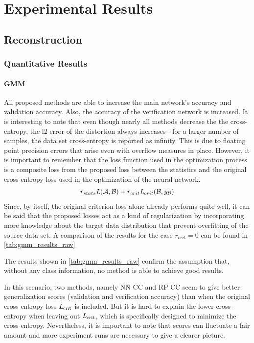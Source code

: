 \chapter{Experimental Results}
\label{chap:Results} 

\section{Reconstruction}

\subsection{Quantitative Results}

\subsubsection{GMM}

All proposed methods are able to increase the main network's accuracy and validation accuracy.
Also, the accuracy of the verification network is increased.
It is interesting to note that even though nearly all methods decrease the 
the cross-entropy, the l2-error of the distortion always increases
- for a larger number of samples, the data set cross-entropy is reported as infinity.
This is due to floating point precision errors that arise even with overflow measures in place.
However, it is important to remember that the loss function used in the optimization process
is a composite loss from the proposed loss between the statistics
and the original cross-entropy loss used in the optimization of the neural network.
\[
    r_{stats} \textit{L}(\mathcal A, \mathcal B) + r_{crit}\textit{L}_{crit}(\mathcal B, y_{\mathcal B})
\]
Since, by itself, the original criterion loss alone already performs quite well, 
it can be said that the proposed losses act as a kind of regularization 
by incorporating more knowledge about the target data distribution that prevent overfitting
of the source data set.
A comparison of the results for the case $r_{crit}=0$ can be found in \cref{tab:gmm_results_raw}

The results shown in \cref{tab:gmm_results_raw} confirm the assumption that,
without any class information, no method is able to achieve good results.

In this scenario, two methods, namely NN CC and RP CC seem to give 
better generalization scores 
(validation and verification accuracy) than when the original cross-entropy loss 
$\textit{L}_\text{crit}$ is included.
But it is hard to explain the lower cross-entropy when leaving out 
$\textit{L}_\text{crit}$, which is specifically designed to minimize the cross-entropy.
Nevertheless, it is important to note that scores can fluctuate a fair amount and more 
experiment runs are necessary to give a clearer picture.

